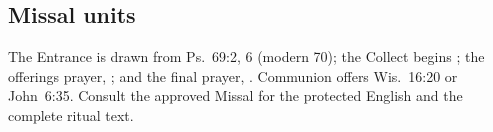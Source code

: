 \subsection*{Missal units}
The Entrance is drawn from Ps.~69:2, 6 (modern 70); the Collect begins
; the offerings prayer,
; and the final
prayer, . Communion offers Wis.~16:20 or
John~6:35. Consult the approved Missal for the protected English and the
complete ritual text.
